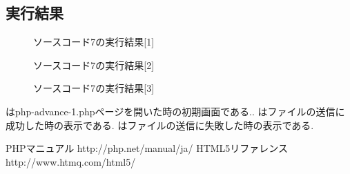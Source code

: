\documentclass[a4j,10pt]{jsarticle}
\begin{document}


\subsection{実行結果}

\begin{figure}[H]
  \centering
  \caption{ソースコード7の実行結果[1]}
\label{fig:ad3}
\end{figure}

\begin{figure}[H]
  \centering
  \caption{ソースコード7の実行結果[2]}
\label{fig:ad4}
\end{figure}
\begin{figure}[H]
  \centering
  \caption{ソースコード7の実行結果[3]}
\label{fig:ad5}
\end{figure}

はphp-advance-1.phpページを開いた時の初期画面である..
はファイルの送信に成功した時の表示である.
はファイルの送信に失敗した時の表示である.

\begin{thebibliography}{4}
   PHPマニュアル http://php.net/manual/ja/
   HTML5リファレンス http://www.htmq.com/html5/
\end{thebibliography}
\end{document}
